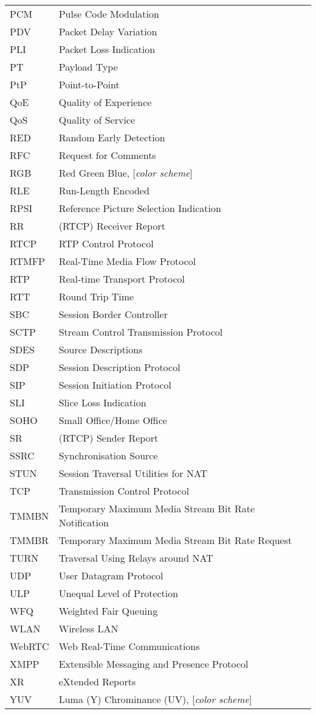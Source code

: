 \begin{longtable}{ll}
PCM 	& Pulse Code Modulation \\
PDV  	& Packet Delay Variation \\
PLI 	& Packet Loss Indication \\
PT  	& Payload Type \\
PtP 	& Point-to-Point \\
QoE 	& Quality of Experience \\
QoS 	& Quality of Service \\
RED 	& Random Early Detection \\
RFC 	& Request for Comments \\
RGB 	& Red Green Blue, [\textit{color scheme}] \\
RLE  	& Run-Length Encoded \\
RPSI 	& Reference Picture Selection Indication \\
RR  	& (RTCP) Receiver Report \\
RTCP 	& RTP Control Protocol \\
RTMFP	& Real-Time Media Flow Protocol \\
RTP 	& Real-time Transport Protocol \\
RTT 	& Round Trip Time \\
SBC  	& Session Border Controller \\
SCTP 	& Stream Control Transmission Protocol  \\
SDES	& Source Descriptions \\
SDP 	& Session Description Protocol \\
SIP 	& Session Initiation Protocol \\
SLI 	& Slice Loss Indication \\
SOHO 	& Small Office/Home Office \\
SR  	& (RTCP) Sender Report \\
SSRC	& Synchronisation Source \\
STUN  	& Session Traversal Utilities for NAT \\
TCP 	& Transmission Control Protocol \\
TMMBN 	& Temporary Maximum Media Stream Bit Rate Notification \\
TMMBR 	& Temporary Maximum Media Stream Bit Rate Request \\
TURN  	& Traversal Using Relays around NAT \\
UDP 	& User Datagram Protocol \\
ULP 	& Unequal Level of Protection \\
WFQ 	& Weighted Fair Queuing \\
WLAN	& Wireless LAN \\
WebRTC	& Web Real-Time Communications \\
XMPP 	& Extensible Messaging and Presence Protocol \\
XR  	& eXtended Reports \\
YUV 	& Luma (Y) Chrominance (UV), [\textit{color scheme}] \\
\end{longtable}

